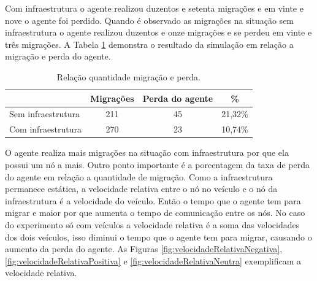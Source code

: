 Com infraestrutura o agente realizou duzentos e setenta migrações e em vinte e nove o agente foi perdido. Quando é observado as migrações na situação sem infraestrutura o agente realizou duzentos e onze migrações e se perdeu em vinte e três migrações. A Tabela \ref{tab:migracoesPerda} demonstra o resultado da simulação em relação a migração e perda do agente.

\begin{table}[ht]
	\caption{Relação quantidade migração e perda.}
	\centering
	\begin{tabular}{ | l | c | c | c |}
		\hline
					& Migrações & Perda do agente & \% \\ \hline
		Sem infraestrutura & 211 & 45 & 21,32\%  \\ \hline
		Com infraestrutura & 270 & 23 & 10,74\%  \\ \hline
	\end{tabular}
	\label{tab:migracoesPerda}
\end{table}

O agente realiza mais migrações na situação com infraestrutura por que ela possui um nó a mais. Outro ponto importante é a porcentagem da taxa de perda do agente  em relação a quantidade de migração. Como a infraestrutura permanece estática, a velocidade relativa entre o nó no veículo e o nó da infraestrutura é a velocidade do veículo. Então o tempo que o agente tem para migrar e maior por que aumenta o tempo de comunicação entre os nós. No caso do experimento só com veículos a velocidade relativa é a soma das velocidades dos dois veículos, isso diminui o tempo que o agente tem para migrar, causando o aumento da perda do agente. As Figuras \ref{fig:velocidadeRelativaNegativa}, \ref{fig:velocidadeRelativaPositiva} e \ref{fig:velocidadeRelativaNeutra} exemplificam a velocidade relativa.



